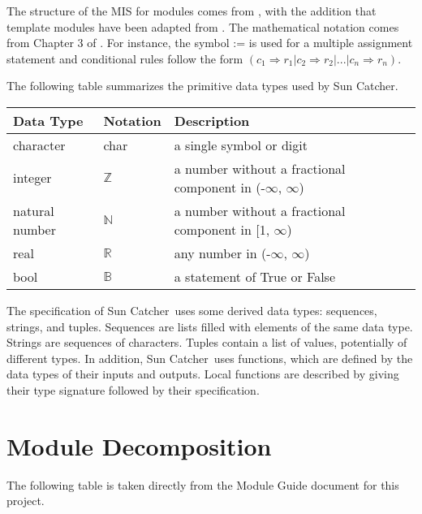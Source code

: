 \documentclass[12pt, titlepage]{article}
\newcommand{\progname}{Sun Catcher}
\begin{document}

The structure of the MIS for modules comes from \citet{HoffmanAndStrooper1995},
with the addition that template modules have been adapted from
\cite{GhezziEtAl2003}.  The mathematical notation comes from Chapter 3 of
\citet{HoffmanAndStrooper1995}.  For instance, the symbol := is used for a
multiple assignment statement and conditional rules follow the form $(c_1
\Rightarrow r_1 | c_2 \Rightarrow r_2 | ... | c_n \Rightarrow r_n )$.

The following table summarizes the primitive data types used by \progname. 

\begin{center}
\renewcommand{\arraystretch}{1.2}
\noindent 
\begin{tabular}{l l p{7.5cm}} 
\toprule 
\textbf{Data Type} & \textbf{Notation} & \textbf{Description}\\ 
\midrule
character & char & a single symbol or digit\\
integer & $\mathbb{Z}$ & a number without a fractional component in  (-$\infty$,
$\infty$) \\
natural number & $\mathbb{N}$ & a number without a fractional component in [1,
$\infty$) \\
real & $\mathbb{R}$ & any number in  (-$\infty$, $\infty$)\\
bool &$\mathbb{B}$ & a statement of True or False\\


\bottomrule
\end{tabular} 
\end{center}

\noindent
The specification of \progname \ uses some derived data types: sequences,
strings, and
tuples. Sequences are lists filled with elements of the same data type. Strings
are sequences of characters. Tuples contain a list of values, potentially of
different types. In addition, \progname \ uses functions, which
are defined by the data types of their inputs and outputs. Local functions are
described by giving their type signature followed by their specification.



\section{Module Decomposition}

The following table is taken directly from the Module Guide document for this
project.
\end{document}
